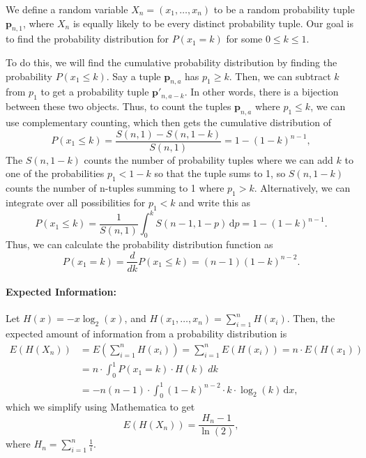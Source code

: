 \documentclass[12pt]{article}
\newcommand{\diffn}[1]{\,\mathrm{d}{#1}}
\begin{document}
We define a random variable $X_n=(x_1,\ldots,x_n)$ to be a random probability tuple $\boldsymbol{p}_{n,1}$, where $X_n$ is equally likely to be every distinct probability tuple. Our goal is to find the probability distribution for $P(x_1=k)$ for some $0\leq k\leq 1$.

To do this, we will find the cumulative probability distribution by finding the probability $P(x_1\leq k)$. Say a tuple $\boldsymbol{p}_{n,a}$ has $p_1\geq k$. Then, we can subtract $k$ from $p_1$ to get a probability tuple $\boldsymbol{p}'_{n,a-k}$. In other words, there is a bijection between these two objects. Thus, to count the tuples $\boldsymbol{p}_{n,a}$ where $p_1\leq k$, we can use complementary counting, which then gets the cumulative distribution of
\begin{equation*}
    P(x_1\leq k)=\frac{S(n,1)-S(n,1-k)}{S(n,1)}=1-(1-k)^{n-1},
\end{equation*}
The $S(n,1-k)$ counts the number of probability tuples where we can add $k$ to one of the probabilities $p_1<1-k$ so that the tuple sums to 1, so $S(n,1-k)$ counts the number of n-tuples summing to 1 where $p_1 > k$. Alternatively, we can integrate over all possibilities for $p_1 < k$ and write this as
\begin{equation*}
    P(x_1\le k) = \frac{1}{S(n,1)}\int_0^k S(n-1,1-p)\diffn{p} = 1-(1-k)^{n-1}.
\end{equation*}
Thus, we can calculate the probability distribution function as
\begin{equation*}
    P(x_1=k)=\frac{d}{dk}P(x_1\leq k)=(n-1)(1-k)^{n-2}.
\end{equation*}
\paragraph{Expected Information:}
Let $H(x)=-x\log_2(x)$, and $H(x_1,\ldots,x_n)=\sum_{i=1}^n H(x_i)$. Then, the expected amount of information from a probability distribution is
\begin{align*}
    E(H(X_n))&=E\left(\sum_{i=1}^n H(x_i)\right)=\sum_{i=1}^n E(H(x_i))=n\cdot E(H(x_1))\\
    &=n\cdot\int_0^1 P(x_1=k)\cdot H(k)\;dk\\
    &=-n(n-1)\cdot \int_0^1 (1-k)^{n-2}\cdot k\cdot \log_2(k)\diffn{x},
\end{align*}
which we simplify using Mathematica to get
\begin{equation*}
    E(H(X_n))=\frac{H_n-1}{\ln(2)},
\end{equation*}
where $H_n=\sum_{i=1}^n\frac{1}{i}$.
\end{document}
